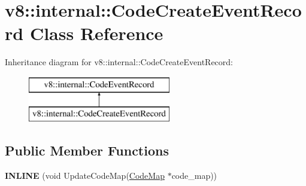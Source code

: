 \hypertarget{classv8_1_1internal_1_1_code_create_event_record}{}\section{v8\+:\+:internal\+:\+:Code\+Create\+Event\+Record Class Reference}
\label{classv8_1_1internal_1_1_code_create_event_record}
Inheritance diagram for v8\+:\+:internal\+:\+:Code\+Create\+Event\+Record\+:\begin{figure}[H]
\begin{center}
\leavevmode
\includegraphics[height=2.000000cm]{classv8_1_1internal_1_1_code_create_event_record}
\end{center}
\end{figure}
\subsection*{Public Member Functions}
\begin{DoxyCompactItemize}
\item 
\hypertarget{classv8_1_1internal_1_1_code_create_event_record_ae675504aefc7776a63c37ca8749b389f}{}{\bfseries I\+N\+L\+I\+N\+E} (void Update\+Code\+Map(\hyperlink{classv8_1_1internal_1_1_code_map}{Code\+Map} $\ast$code\+\_\+map))\label{classv8_1_1internal_1_1_code_create_event_record_ae675504aefc7776a63c37ca8749b389f}

\end{DoxyCompactItemize}
